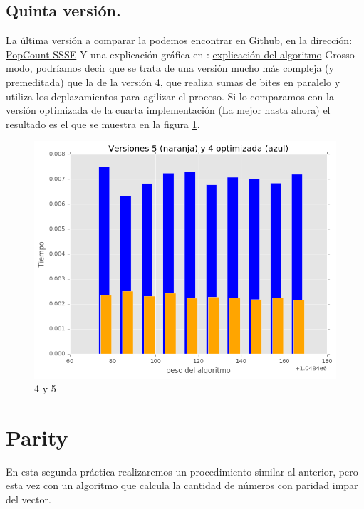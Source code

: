 \documentclass[a4paper, 11pt]{article}
\begin{document}
\subsection{Quinta versión.}
La última versión a comparar la podemos encontrar en Github, en la dirección: 
\href{https://github.com/WojciechMula/sse-popcount/blob/master/original/ssse3_popcount.c}{PopCount-SSSE}
Y una explicación gráfica en : \href{https://swad.ugr.es/swad/tmp/8bjaqPAeqvL0feJfeyxpCOQWZuXTEo-5cDNq33cXc7s/popcount5.txt}{explicación del algoritmo}
Grosso modo, podríamos decir que se trata de una versión mucho más compleja (y premeditada) que la de la versión 4, que realiza sumas de bites en paralelo y utiliza los deplazamientos para agilizar el proceso. Si lo comparamos con la versión optimizada de la cuarta implementación (La mejor hasta ahora) el resultado es el que se muestra en la figura \ref{4y5}. 
\begin{figure}[!htbp]
	\includegraphics[scale=0.6]{4y5.png}
	\caption{4 y 5	\label{4y5}}
\end{figure}
\pagebreak
\section{Parity}
En esta segunda práctica realizaremos un procedimiento similar al anterior, pero esta vez con un algoritmo que calcula la cantidad de números con paridad impar del vector. 
\end{document}
